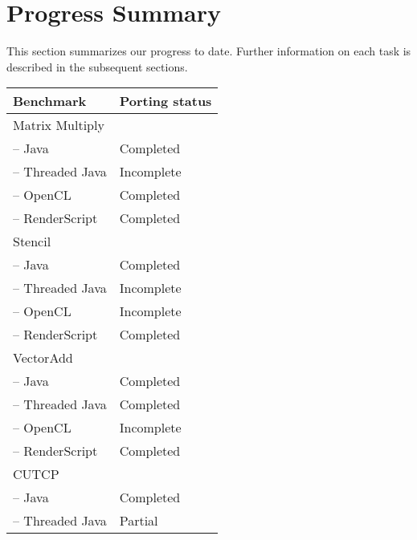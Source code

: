 \section*{Progress Summary}

This section summarizes our progress to date. Further information on each task
is described in the subsequent sections.


\begin{table}[h]\small
\centering
\begin{tabular}{ | l | p{2cm} |}
    \hline 
    Benchmark & Porting status \\ \hline
    Matrix Multiply & \\
    \hspace{0.5cm}-- Java & Completed \\
    \hspace{0.5cm}-- Threaded Java & Incomplete \\
    \hspace{0.5cm}-- OpenCL & Completed \\
    \hspace{0.5cm}-- RenderScript & Completed \\ \hline
    Stencil & \\
    \hspace{0.5cm}-- Java & Completed \\
    \hspace{0.5cm}-- Threaded Java & Incomplete \\
    \hspace{0.5cm}-- OpenCL & Incomplete \\
    \hspace{0.5cm}-- RenderScript & Completed \\ \hline
    VectorAdd & \\
    \hspace{0.5cm}-- Java & Completed \\
    \hspace{0.5cm}-- Threaded Java & Completed \\
    \hspace{0.5cm}-- OpenCL & Incomplete \\
    \hspace{0.5cm}-- RenderScript & Completed \\ \hline
    CUTCP & \\
    \hspace{0.5cm}-- Java & Completed \\
    \hspace{0.5cm}-- Threaded Java & Partial \\

\end{tabular}
\end{table}
